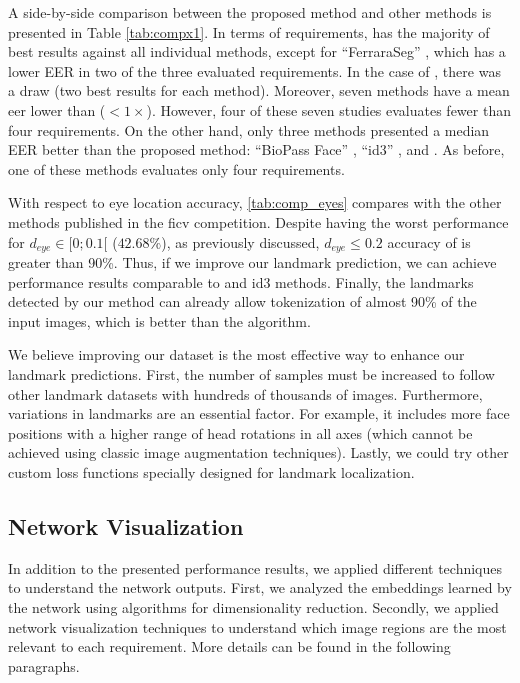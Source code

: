 

A side-by-side comparison between the proposed method and other methods is presented in Table \ref{tab:compx1}. In terms of requirements, \methodname has the majority of best results against all individual methods, except for ``FerraraSeg'' \citep{ferrara2012multi}, which has a lower EER in two of the three evaluated requirements. In the case of \citep{parente2016assessing}, there was a draw (two best results for each method). Moreover, seven methods have a mean \acs{eer} lower than \methodname ($< 1\times$). However, four of these seven studies evaluates fewer than four requirements. On the other hand, only three methods presented a median EER better than the proposed method: ``BioPass Face'' \citep{fvcVsoft}, ``id3'' \citep{id3}, and \citep{parente2016assessing}. As before, one of these methods evaluates only four requirements.
 
With respect to eye location accuracy, \autoref{tab:comp_eyes} compares \methodname with the other methods published in the \acs{ficv} competition. Despite having the worst performance for $d_{eye} \in [0;0.1[$ ($42.68\%$), as previously discussed, $d_{eye} \leq 0.2$ accuracy of \methodname is greater than 90\%. Thus, if we improve our landmark prediction, we can achieve performance results comparable to \biopass and id3 methods. Finally, the landmarks detected by our method can already allow tokenization of almost 90\% of the input images, which is better than the \biotest algorithm.
 
We believe improving our dataset is the most effective way to enhance our landmark predictions. First, the number of samples must be increased to follow other landmark datasets with hundreds of thousands of images. Furthermore, variations in landmarks are an essential factor. For example, it includes more face positions with a higher range of head rotations in all axes (which cannot be achieved using classic image augmentation techniques). Lastly, we could try other custom loss functions specially designed for landmark localization.
 


\subsection{Network Visualization} \label{sec:netviz}
 
In addition to the presented performance results, we applied different techniques to understand the network outputs. First, we analyzed the embeddings learned by the network using algorithms for dimensionality reduction. Secondly, we applied network visualization techniques to understand which image regions are the most relevant to each requirement. More details can be found in the following paragraphs.
 
